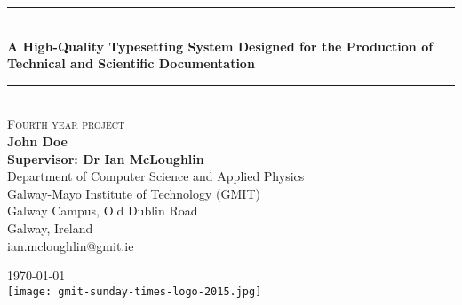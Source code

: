 \begin{titlepage}
  \begin{center}

    \rule{\linewidth}{0.5mm} \\[0.4cm]
    { \LARGE \bfseries A High-Quality Typesetting System Designed for the Production of Technical and Scientific Documentation \\[0.4cm] }
    
    \rule{\linewidth}{0.5mm} \\[0.8cm]
    
    \textsc{Fourth year project}\\[3cm]
    
    \noindent
    \textbf{John Doe}\\
    \textbf{Supervisor: Dr Ian McLoughlin}\\
    Department of Computer Science and Applied Physics\\
    Galway-Mayo Institute of Technology (GMIT)\\
    Galway Campus, Old Dublin Road\\
    Galway, Ireland\\[0.2cm]
    ian.mcloughlin@gmit.ie
    
    \vfill
    
    {\large \today}
    \\[1cm]
    \texttt{[image: gmit-sunday-times-logo-2015.jpg]}
  
  \end{center}
\end{titlepage}